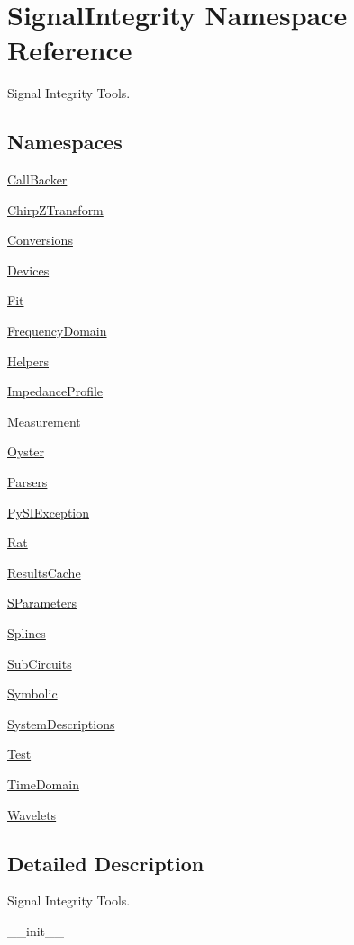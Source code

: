 \hypertarget{namespaceSignalIntegrity}{}\section{Signal\+Integrity Namespace Reference}
\label{namespaceSignalIntegrity}


Signal Integrity Tools.  


\subsection*{Namespaces}
\begin{DoxyCompactItemize}
\item 
 \hyperlink{namespaceSignalIntegrity_1_1CallBacker}{Call\+Backer}
\item 
 \hyperlink{namespaceSignalIntegrity_1_1ChirpZTransform}{Chirp\+Z\+Transform}
\item 
 \hyperlink{namespaceSignalIntegrity_1_1Conversions}{Conversions}
\item 
 \hyperlink{namespaceSignalIntegrity_1_1Devices}{Devices}
\item 
 \hyperlink{namespaceSignalIntegrity_1_1Fit}{Fit}
\item 
 \hyperlink{namespaceSignalIntegrity_1_1FrequencyDomain}{Frequency\+Domain}
\item 
 \hyperlink{namespaceSignalIntegrity_1_1Helpers}{Helpers}
\item 
 \hyperlink{namespaceSignalIntegrity_1_1ImpedanceProfile}{Impedance\+Profile}
\item 
 \hyperlink{namespaceSignalIntegrity_1_1Measurement}{Measurement}
\item 
 \hyperlink{namespaceSignalIntegrity_1_1Oyster}{Oyster}
\item 
 \hyperlink{namespaceSignalIntegrity_1_1Parsers}{Parsers}
\item 
 \hyperlink{namespaceSignalIntegrity_1_1PySIException}{Py\+S\+I\+Exception}
\item 
 \hyperlink{namespaceSignalIntegrity_1_1Rat}{Rat}
\item 
 \hyperlink{namespaceSignalIntegrity_1_1ResultsCache}{Results\+Cache}
\item 
 \hyperlink{namespaceSignalIntegrity_1_1SParameters}{S\+Parameters}
\item 
 \hyperlink{namespaceSignalIntegrity_1_1Splines}{Splines}
\item 
 \hyperlink{namespaceSignalIntegrity_1_1SubCircuits}{Sub\+Circuits}
\item 
 \hyperlink{namespaceSignalIntegrity_1_1Symbolic}{Symbolic}
\item 
 \hyperlink{namespaceSignalIntegrity_1_1SystemDescriptions}{System\+Descriptions}
\item 
 \hyperlink{namespaceSignalIntegrity_1_1Test}{Test}
\item 
 \hyperlink{namespaceSignalIntegrity_1_1TimeDomain}{Time\+Domain}
\item 
 \hyperlink{namespaceSignalIntegrity_1_1Wavelets}{Wavelets}
\end{DoxyCompactItemize}


\subsection{Detailed Description}
Signal Integrity Tools. 

\begin{DoxyVerb}__init__\end{DoxyVerb}
 